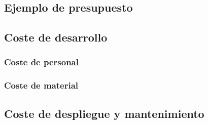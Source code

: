 \subsection{Ejemplo de presupuesto}

\subsection{Coste de desarrollo}

\subsubsection{Coste de personal}

\subsubsection{Coste de material}

\subsection{Coste de despliegue y mantenimiento}